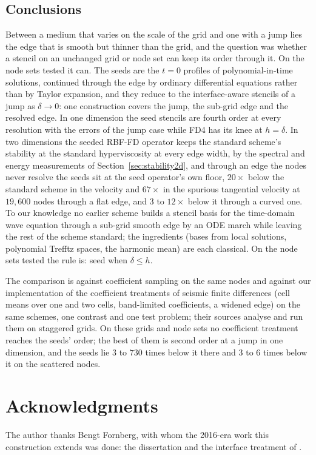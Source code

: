 \documentclass[11pt]{amsart}
\theoremstyle{definition}
\theoremstyle{remark}
\begin{document}
\subsection{Conclusions}
\label{sec:conclusions}
Between a medium that varies on the scale of the grid and one with a
jump lies the edge that is smooth but thinner than the grid, and the
question was whether a stencil on an unchanged grid or node set can
keep its order through it. On the node sets tested it can. The seeds
are the $t = 0$ profiles of polynomial-in-time solutions, continued
through the edge by ordinary differential equations rather than by
Taylor expansion, and they reduce to the interface-aware stencils of a
jump as $\delta \to 0$: one construction covers the jump, the sub-grid
edge and the resolved edge. In one dimension the seed stencils are
fourth order at every resolution with the errors of the jump case while
FD4 has its knee at $h = \delta$. In two dimensions the seeded RBF-FD
operator keeps the standard scheme's stability at the standard
hyperviscosity at every edge width, by the spectral and energy
measurements of Section~\ref{sec:stability2d},
and through an edge the nodes never resolve the seeds sit at the seed
operator's own floor, $20\times$ below the standard scheme in the
velocity and $67\times$ in the spurious tangential velocity at
$19{,}600$ nodes through a flat edge, and $3$ to $12\times$ below it
through a curved one. To our knowledge no earlier scheme builds a
stencil basis for the time-domain wave equation through a sub-grid
smooth edge by an ODE march while leaving the rest of the scheme
standard; the ingredients (bases from local solutions, polynomial
Trefftz spaces, the harmonic mean) are each classical. On the node sets
tested the rule is: seed when $\delta \le h$.

The comparison is against coefficient sampling on the same nodes and
against our implementation of the coefficient treatments of seismic
finite differences (cell means over one and two cells, band-limited
coefficients, a widened edge) on the same schemes, one contrast and one
test problem; their sources analyse and run them on staggered grids. On
these grids and node sets no coefficient treatment reaches the seeds'
order; the best of them is second order at a jump in one dimension, and
the seeds lie $3$ to $730$ times below it there and $3$ to $6$ times
below it on the scattered nodes.

\section*{Acknowledgments}
The author thanks Bengt Fornberg, with whom the 2016-era work this
construction extends was done: the dissertation \cite{Martin2016} and the
interface treatment of \cite{MartinFornberg2017}.
\end{document}
